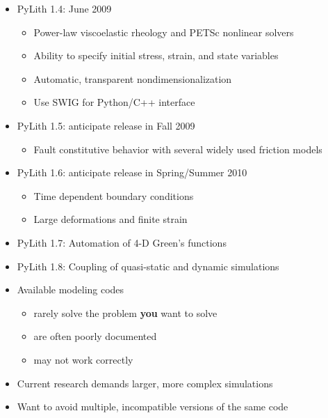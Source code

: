 \documentclass[pdftex,cig,slideColor]{pp4slides}
\begin{document}

  \begin{itemize}
  \item PyLith 1.4: June 2009
    \begin{itemize}
    \item Power-law viscoelastic rheology and PETSc nonlinear solvers
    \item Ability to specify initial stress, strain, and state variables
    \item Automatic, transparent nondimensionalization
    \item Use SWIG for Python/C++ interface
    \end{itemize}
  \item PyLith 1.5: anticipate release in Fall 2009
    \begin{itemize}
    \item Fault constitutive behavior with several widely used friction models
    \end{itemize}
  \item PyLith 1.6: anticipate release in Spring/Summer 2010
    \begin{itemize}
    \item Time dependent boundary conditions
    \item Large deformations and finite strain
    \end{itemize}
  \item PyLith 1.7: Automation of 4-D Green's functions
  \item PyLith 1.8: Coupling of quasi-static and dynamic simulations
  \end{itemize}
  
  \summary{}
  
  \begin{itemize}
  \item Available modeling codes
    \begin{itemize}
    \item rarely solve the problem {\bf you} want to solve
    \item are often poorly documented
    \item may not work correctly
    \end{itemize}
  \item Current research demands larger, more complex simulations
  \item Want to avoid multiple, incompatible versions of the same code
  \end{itemize}
\end{document}
